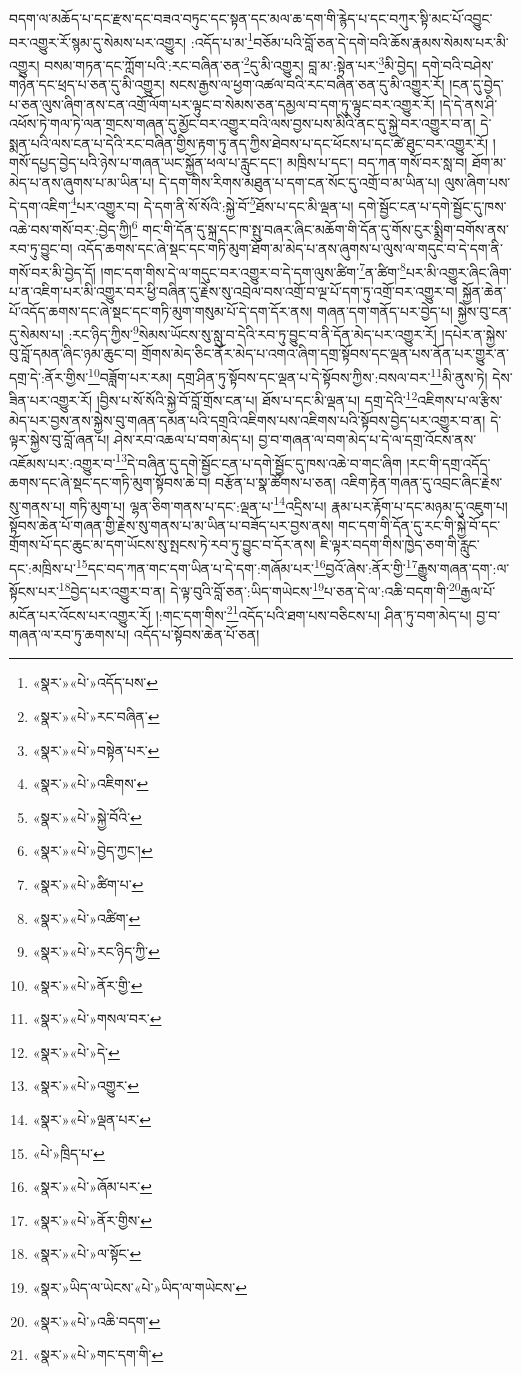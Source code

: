བདག་ལ་མཆོད་པ་དང་རྫས་དང་བཟའ་བཏུང་དང་སྟན་དང་མལ་ཆ་དག་གི་རྙེད་པ་དང་བཀུར་སྟི་མང་པོ་འབྱུང་བར་འགྱུར་རོ་སྙམ་དུ་སེམས་པར་འགྱུར། :འདོད་པ་མ་\footnote{«སྣར་»«པེ་»འདོད་པས་}བཅོམ་པའི་བློ་ཅན་དེ་དགེ་བའི་ཆོས་རྣམས་སེམས་པར་མི་འགྱུར། བསམ་གཏན་དང་ཀློག་པའི་:རང་བཞིན་ཅན་\footnote{«སྣར་»«པེ་»རང་བཞིན་}དུ་མི་འགྱུར། བླ་མ་:སྟེན་པར་\footnote{«སྣར་»«པེ་»བསྟེན་པར་}མི་བྱེད། དགེ་བའི་བཤེས་གཉེན་དང་ཕྲད་པ་ཅན་དུ་མི་འགྱུར། སངས་རྒྱས་ལ་ཕྱག་འཚལ་བའི་རང་བཞིན་ཅན་དུ་མི་འགྱུར་རོ། །ངན་དུ་བྱེད་པ་ཅན་ལུས་ཞིག་ནས་ངན་འགྲོ་ལོག་པར་ལྟུང་བ་སེམས་ཅན་དམྱལ་བ་དག་ཏུ་ལྟུང་བར་འགྱུར་རོ། །དེ་དེ་ནས་ཤི་འཕོས་ཏེ་གལ་ཏེ་ལན་གྲངས་གཞན་དུ་མྱོང་བར་འགྱུར་བའི་ལས་བྱས་པས་མིའི་ནང་དུ་སྐྱེ་བར་འགྱུར་བ་ན། དེ་སྨན་པའི་ལས་ངན་པ་དེའི་རང་བཞིན་གྱིས་རྟག་ཏུ་ནད་ཀྱིས་ཐེབས་པ་དང་ཕོངས་པ་དང་ཚེ་ཐུང་བར་འགྱུར་རོ། །གསོ་དཔྱད་བྱེད་པའི་ཉེས་པ་གཞན་ཡང་སྐྱོན་ཕལ་པ་རླུང་དང་། མཁྲིས་པ་དང་། བད་ཀན་གསོ་བར་སླ་བ། ཐོག་མ་མེད་པ་ནས་ཞུགས་པ་མ་ཡིན་པ། དེ་དག་གིས་རིགས་མཐུན་པ་དག་ངན་སོང་དུ་འགྲོ་བ་མ་ཡིན་པ། ལུས་ཞིག་པས་དེ་དག་འཇིག་\footnote{«སྣར་»«པེ་»འཇིགས་}པར་འགྱུར་བ། དེ་དག་ནི་སོ་སོའི་:སྐྱེ་བོ་\footnote{«སྣར་»«པེ་»སྐྱེ་བོའི་}ཐོས་པ་དང་མི་ལྡན་པ། དགེ་སྦྱོང་ངན་པ་དགེ་སྦྱོང་དུ་ཁས་འཆེ་བས་གསོ་བར་:བྱེད་ཀྱི།\footnote{«སྣར་»«པེ་»བྱེད་ཀྱང་།} གང་གི་དོན་དུ་སྐྲ་དང་ཁ་སྤུ་བཞར་ཞིང་མཆོག་གི་དོན་དུ་གོས་ངུར་སྨྲིག་བགོས་ནས་རབ་ཏུ་བྱུང་བ། འདོད་ཆགས་དང་ཞེ་སྡང་དང་གཏི་མུག་ཐོག་མ་མེད་པ་ནས་ཞུགས་པ་ལུས་ལ་གདུང་བ་དེ་དག་ནི་གསོ་བར་མི་བྱེད་དོ། །གང་དག་གིས་དེ་ལ་གདུང་བར་འགྱུར་བ་དེ་དག་ལུས་ཚིག་\footnote{«སྣར་»«པེ་»ཚིག་པ་}ན་ཚིག་\footnote{«སྣར་»«པེ་»འཚིག་}པར་མི་འགྱུར་ཞིང་ཞིག་པ་ན་འཇིག་པར་མི་འགྱུར་བར་ཕྱི་བཞིན་དུ་རྗེས་སུ་འབྲེལ་བས་འགྲོ་བ་ལྔ་པོ་དག་ཏུ་འགྲོ་བར་འགྱུར་བ། སྐྱོན་ཆེན་པོ་འདོད་ཆགས་དང་ཞེ་སྡང་དང་གཏི་མུག་གསུམ་པོ་དེ་དག་དོར་ནས། གཞན་དག་གནོད་པར་བྱེད་པ། སྐྱེས་བུ་ངན་དུ་སེམས་པ། :རང་ཉིད་ཀྱིས་\footnote{«སྣར་»«པེ་»རང་ཉིད་ཀྱི་}སེམས་ཡོངས་སུ་སླུ་བ་དེའི་རབ་ཏུ་བྱུང་བ་ནི་དོན་མེད་པར་འགྱུར་རོ། །དཔེར་ན་སྐྱེས་བུ་བློ་དམན་ཞིང་ཉམ་ཆུང་བ། གྲོགས་མེད་ཅིང་ནོར་མེད་པ་འགའ་ཞིག་དགྲ་སྟོབས་དང་ལྡན་པས་ནོན་པར་གྱུར་ན་དགྲ་དེ་:ནོར་གྱིས་\footnote{«སྣར་»«པེ་»ནོར་གྱི་}བཟློག་པར་རམ། དགྲ་ཤིན་ཏུ་སྟོབས་དང་ལྡན་པ་དེ་སྟོབས་ཀྱིས་:བསལ་བར་\footnote{«སྣར་»«པེ་»གསལ་བར་}མི་ནུས་ཏེ། དེས་ཟིན་པར་འགྱུར་རོ། །བྱིས་པ་སོ་སོའི་སྐྱེ་བོ་བློ་གྲོས་ངན་པ། ཐོས་པ་དང་མི་ལྡན་པ། དགྲ་དེའི་\footnote{«སྣར་»«པེ་»དེ་}འཇིགས་པ་ལ་རྩིས་མེད་པར་བྱས་ནས་སྐྱེས་བུ་གཞན་དམན་པའི་དགྲའི་འཇིགས་པས་འཇིགས་པའི་སྟོབས་བྱེད་པར་འགྱུར་བ་ན། དེ་ལྟར་སྐྱེས་བུ་བློ་ཞན་པ། ཤེས་རབ་འཆལ་པ་བག་མེད་པ། བྱ་བ་གཞན་ལ་བག་མེད་པ་དེ་ལ་དགྲ་འོངས་ནས་འཇོམས་པར་:འགྱུར་བ་\footnote{«སྣར་»«པེ་»འགྱུར་}དེ་བཞིན་དུ་དགེ་སྦྱོང་ངན་པ་དགེ་སྦྱོང་དུ་ཁས་འཆེ་བ་གང་ཞིག །རང་གི་དགྲ་འདོད་ཆགས་དང་ཞེ་སྡང་དང་གཏི་མུག་སྟོབས་ཆེ་བ། བརྩོན་པ་སྣ་ཚོགས་པ་ཅན། འཇིག་རྟེན་གཞན་དུ་འབྲང་ཞིང་རྗེས་སུ་གནས་པ། གཏི་མུག་པ། ལྷན་ཅིག་གནས་པ་དང་:ལྡན་པ་\footnote{«སྣར་»«པེ་»ལྡན་པར་}འདྲིས་པ། རྣམ་པར་རྟོག་པ་དང་མཉམ་དུ་འཇུག་པ། སྟོབས་ཆེན་པོ་གཞན་གྱི་རྗེས་སུ་གནས་པ་མ་ཡིན་པ་བཟོད་པར་བྱས་ནས། གང་དག་གི་དོན་དུ་རང་གི་སྐྱེ་བོ་དང་གྲོགས་པོ་དང་ཆུང་མ་དག་ཡོངས་སུ་སྤངས་ཏེ་རབ་ཏུ་བྱུང་བ་དོར་ནས། ཇི་ལྟར་བདག་གིས་ཁྱེད་ཅག་གི་རླུང་དང་:མཁྲིས་པ་\footnote{«པེ་»ཁྲིད་པ་}དང་བད་ཀན་གང་དག་ཡིན་པ་དེ་དག་:གཞོམ་པར་\footnote{«སྣར་»«པེ་»ཞོམ་པར་}བྱའོ་ཞེས་:ནོར་གྱི་\footnote{«སྣར་»«པེ་»ནོར་གྱིས་}རྒྱུས་གཞན་དག་:ལ་སྟོངས་པར་\footnote{«སྣར་»«པེ་»ལ་སྟོང་}བྱེད་པར་འགྱུར་བ་ན། དེ་ལྟ་བུའི་བློ་ཅན་:ཡིད་གཡེངས་\footnote{«སྣར་»ཡིད་ལ་ཡེངས་«པེ་»ཡིད་ལ་གཡེངས་}པ་ཅན་དེ་ལ་:འཆི་བདག་གི་\footnote{«སྣར་»«པེ་»འཆི་བདག་}རྒྱལ་པོ་མངོན་པར་འོངས་པར་འགྱུར་རོ། །:གང་དག་གིས་\footnote{«སྣར་»«པེ་»གང་དག་གི་}འདོད་པའི་ཐག་པས་བཅིངས་པ། ཤིན་ཏུ་བག་མེད་པ། བྱ་བ་གཞན་ལ་རབ་ཏུ་ཆགས་པ། འདོད་པ་སྟོབས་ཆེན་པོ་ཅན། 